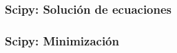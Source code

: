 \documentclass[14pt,aspectratio=169,xcolor=dvipsnames]{beamer}
\begin{document}
\begin{frame}
\begin{columns}
\begin{column}{0.39\textwidth}
{{            }
            }
        \end{column}
    \end{columns}
\end{frame}
\begin{frame}\frametitle{Scipy: Solución de ecuaciones}
\end{frame}
\begin{frame}\frametitle{Scipy: Minimización}
\end{frame}
\begin{frame}
    \maketitle
\end{frame}
\end{document}
